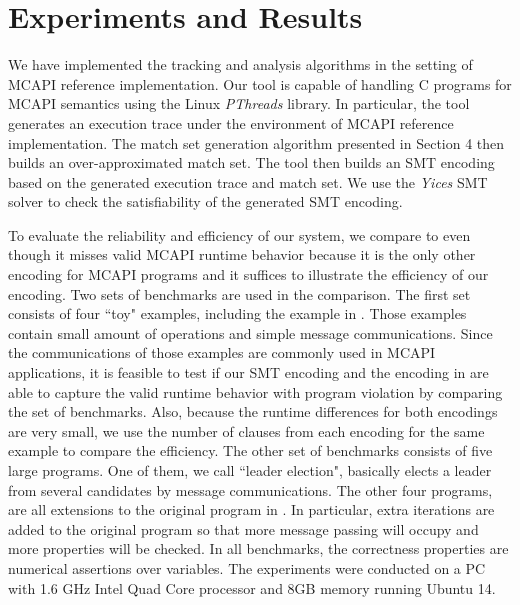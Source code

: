 \section{Experiments and Results}
We have implemented the tracking and analysis algorithms in the setting of MCAPI reference implementation. Our tool is capable of handling C programs for MCAPI semantics using the Linux \textit{PThreads} library. In particular, the tool generates an execution trace under the environment of MCAPI reference implementation. The match set generation algorithm presented in Section 4 then builds an over-approximated match set. The tool then builds an SMT encoding based on the generated execution trace and match set. We use the \textit{Yices} SMT solver \cite{dutertre:CAV06} to check the satisfiability of the generated SMT encoding.

To evaluate the reliability and efficiency of our system, we compare to \cite{elwakil:padtad10} even though it misses valid MCAPI runtime behavior because it is the only other encoding for MCAPI programs and it suffices to illustrate the efficiency of our encoding. Two sets of benchmarks are used in the comparison. The first set consists of four ``toy" examples, including the example in . Those examples contain small amount of operations and simple message communications. Since the communications of those examples are commonly used in MCAPI applications, it is feasible to test if our SMT encoding and the encoding in \cite{elwakil:padtad10} are able to capture the valid runtime behavior with program violation by comparing the set of benchmarks. Also, because the runtime differences for both encodings are very small, we use the number of clauses from each encoding for the same example to compare the efficiency. The other set of benchmarks consists of five large programs. One of them, we call ``leader election", basically elects a leader from several candidates by message communications. The other four programs, are all extensions to the original program in . In particular, extra iterations are added to the original program so that more message passing will occupy and more properties will be checked. In all benchmarks, the correctness properties are numerical assertions over variables. The experiments were conducted on a PC with 1.6 GHz Intel Quad Core processor and 8GB memory running Ubuntu 14.

